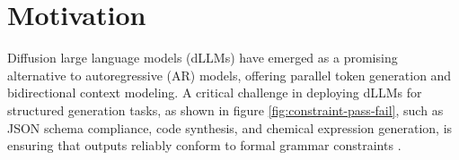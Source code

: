



\section{Motivation} %



Diffusion large language models (dLLMs) have emerged as a promising alternative to autoregressive (AR) models, offering parallel token generation and bidirectional context modeling. A critical challenge in deploying dLLMs for structured generation tasks, as shown in figure \ref{fig:constraint-pass-fail}, such as JSON schema compliance, code synthesis, and chemical expression generation, is ensuring that outputs reliably conform to formal grammar constraints \citep{cd4dllm}.

